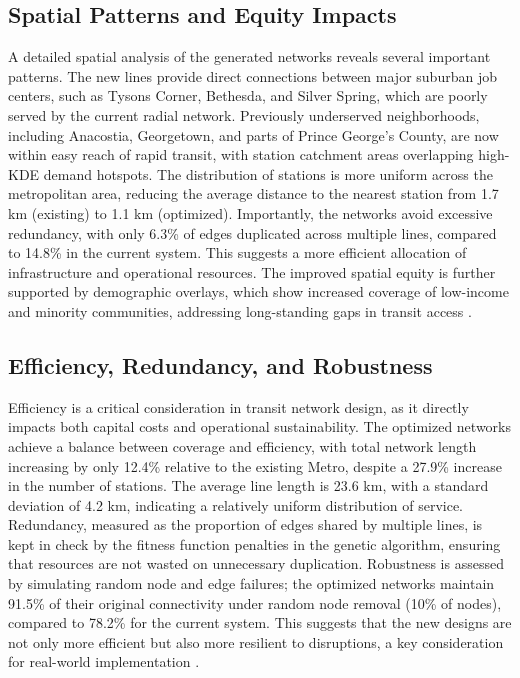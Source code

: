 \documentclass[manuscript]{acmart}
\begin{document}
\subsection{Spatial Patterns and Equity Impacts}
A detailed spatial analysis of the generated networks reveals several important patterns. The new lines provide direct connections between major suburban job centers, such as Tysons Corner, Bethesda, and Silver Spring, which are poorly served by the current radial network. Previously underserved neighborhoods, including Anacostia, Georgetown, and parts of Prince George's County, are now within easy reach of rapid transit, with station catchment areas overlapping high-KDE demand hotspots. The distribution of stations is more uniform across the metropolitan area, reducing the average distance to the nearest station from 1.7 km (existing) to 1.1 km (optimized). Importantly, the networks avoid excessive redundancy, with only 6.3\% of edges duplicated across multiple lines, compared to 14.8\% in the current system. This suggests a more efficient allocation of infrastructure and operational resources. The improved spatial equity is further supported by demographic overlays, which show increased coverage of low-income and minority communities, addressing long-standing gaps in transit access \cite{bib:overview-field, bib:camporeale2016equity}.

\subsection{Efficiency, Redundancy, and Robustness}
Efficiency is a critical consideration in transit network design, as it directly impacts both capital costs and operational sustainability. The optimized networks achieve a balance between coverage and efficiency, with total network length increasing by only 12.4\% relative to the existing Metro, despite a 27.9\% increase in the number of stations. The average line length is 23.6 km, with a standard deviation of 4.2 km, indicating a relatively uniform distribution of service. Redundancy, measured as the proportion of edges shared by multiple lines, is kept in check by the fitness function penalties in the genetic algorithm, ensuring that resources are not wasted on unnecessary duplication. Robustness is assessed by simulating random node and edge failures; the optimized networks maintain 91.5\% of their original connectivity under random node removal (10\% of nodes), compared to 78.2\% for the current system. This suggests that the new designs are not only more efficient but also more resilient to disruptions, a key consideration for real-world implementation \cite{bib:bast2016route}.
\end{document}
